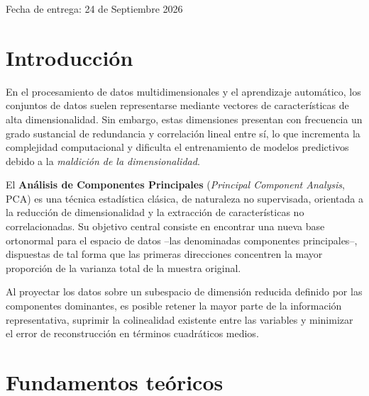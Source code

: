 \documentclass[11pt,letterpaper]{article}
\begin{document}
\begin{titlepage}
		\vfill
		
		{\large Fecha de entrega:  24 de Septiembre 2026}
		
	\end{titlepage}
	
	
	\setcounter{page}{2}
	
	\tableofcontents
	\thispagestyle{plain}
	\newpage
	
	\section{Introducción}
	
	En el procesamiento de datos multidimensionales y el aprendizaje automático, los conjuntos de datos suelen representarse mediante vectores de características de alta dimensionalidad. Sin embargo, estas dimensiones presentan con frecuencia un grado sustancial de redundancia y correlación lineal entre sí, lo que incrementa la complejidad computacional y dificulta el entrenamiento de modelos predictivos debido a la \emph{maldición de la dimensionalidad}.
	
	El \textbf{Análisis de Componentes Principales} (\emph{Principal Component Analysis}, PCA) es una técnica estadística clásica, de naturaleza no supervisada, orientada a la reducción de dimensionalidad y la extracción de características no correlacionadas. Su objetivo central consiste en encontrar una nueva base ortonormal para el espacio de datos --las denominadas componentes principales--, dispuestas de tal forma que las primeras direcciones concentren la mayor proporción de la varianza total de la muestra original.
	
	Al proyectar los datos sobre un subespacio de dimensión reducida definido por las componentes dominantes, es posible retener la mayor parte de la información representativa, suprimir la colinealidad existente entre las variables y minimizar el error de reconstrucción en términos cuadráticos medios.
	
	\newpage
	
	\section{Fundamentos teóricos}
	
\end{document}
